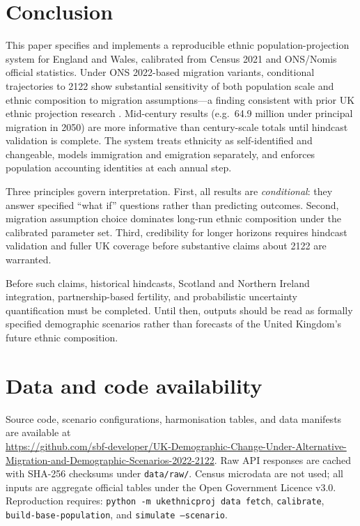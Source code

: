 \documentclass[12pt,a4paper]{article}
\begin{document}
\section{Conclusion}

This paper specifies and implements a reproducible ethnic population-projection system for
England and Wales, calibrated from Census 2021 and ONS/Nomis official statistics. Under
ONS 2022-based migration variants, conditional trajectories to 2122 show substantial
sensitivity of both population scale and ethnic composition to migration assumptions---a
finding consistent with prior UK ethnic projection research \citep{coleman2010, wohland2010}.
Mid-century results (e.g.\ 64.9 million under principal migration in 2050) are more informative
than century-scale totals until hindcast validation is complete.
The system treats ethnicity as self-identified and changeable, models immigration and
emigration separately, and enforces population accounting identities at each annual step.

Three principles govern interpretation. First, all results are \emph{conditional}: they
answer specified ``what if'' questions rather than predicting outcomes. Second, migration
assumption choice dominates long-run ethnic composition under the calibrated parameter set.
Third, credibility for longer horizons requires hindcast validation and fuller UK coverage
before substantive claims about 2122 are warranted.

Before such claims, historical hindcasts, Scotland and Northern Ireland integration,
partnership-based fertility, and probabilistic uncertainty quantification must be completed.
Until then, outputs should be read as formally specified demographic scenarios rather than
forecasts of the United Kingdom's future ethnic composition.

\section*{Data and code availability}

Source code, scenario configurations, harmonisation tables, and data manifests are available at\\
\url{https://github.com/sbf-developer/UK-Demographic-Change-Under-Alternative-Migration-and-Demographic-Scenarios-2022-2122}.
Raw API responses are cached with SHA-256 checksums under \texttt{data/raw/}. Census microdata
are not used; all inputs are aggregate official tables under the Open Government Licence v3.0.
Reproduction requires: \texttt{python -m ukethnicproj data fetch}, \texttt{calibrate},
\texttt{build-base-population}, and \texttt{simulate --scenario}.
\end{document}
